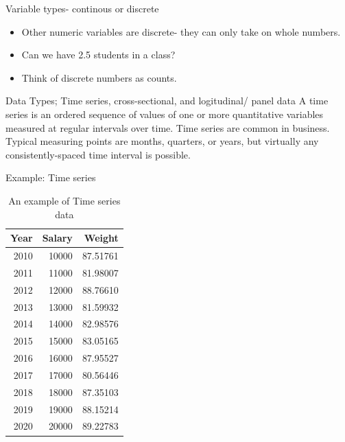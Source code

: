 \documentclass[
  ignorenonframetext,
]{beamer}
\begin{document}
\begin{frame}{Variable types- continous or discrete}
\protect\hypertarget{variable-types--continous-or-discrete-1}{}
\begin{itemize}
\item
  Other numeric variables are discrete- they can only take on whole
  numbers.
\item
  Can we have 2.5 students in a class?
\item
  Think of discrete numbers as counts.
\end{itemize}
\end{frame}

\begin{frame}{Data Types; Time series, cross-sectional, and logitudinal/
panel data}
\protect\hypertarget{data-types-time-series-cross-sectional-and-logitudinal-panel-data}{}
A time series is an ordered sequence of values of one or more
quantitative variables measured at regular intervals over time. Time
series are common in business. Typical measuring points are months,
quarters, or years, but virtually any consistently-spaced time interval
is possible.
\end{frame}

\begin{frame}{Example: Time series}
\protect\hypertarget{example-time-series}{}
\begin{table}

\caption{\label{tab:unnamed-chunk-2}An example of Time series data}
\centering
\begin{tabular}[t]{r|r|r}
\hline
Year & Salary & Weight\\
\hline
2010 & 10000 & 87.51761\\
\hline
2011 & 11000 & 81.98007\\
\hline
2012 & 12000 & 88.76610\\
\hline
2013 & 13000 & 81.59932\\
\hline
2014 & 14000 & 82.98576\\
\hline
2015 & 15000 & 83.05165\\
\hline
2016 & 16000 & 87.95527\\
\hline
2017 & 17000 & 80.56446\\
\hline
2018 & 18000 & 87.35103\\
\hline
2019 & 19000 & 88.15214\\
\hline
2020 & 20000 & 89.22783\\
\hline
\end{tabular}
\end{table}
\end{frame}
\end{document}
